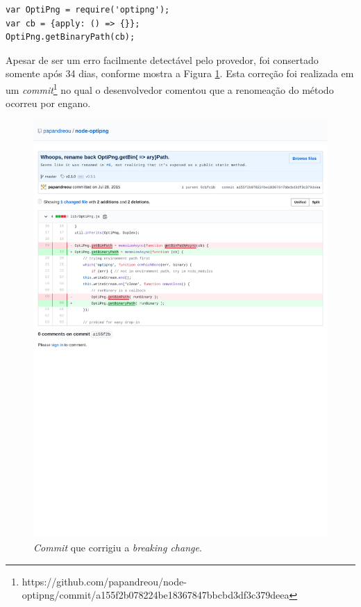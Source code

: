 \begin{lstlisting}[style=Javascript, label=cod:bc:optipng, caption={Código que sofre \textit{breaking change} do pacote \textit{optipng}.}]
var OptiPng = require('optipng');
var cb = {apply: () => {}};
OptiPng.getBinaryPath(cb);
\end{lstlisting}

Apesar de ser um erro facilmente detectável pelo provedor, foi consertado somente após 34 dias, conforme mostra a Figura \ref{fig:bc_optipng}. Esta correção foi realizada em um \textit{commit}\footnote{https://github.com/papandreou/node-optipng/commit/a155f2b078224be18367847bbcbd3df3c379deea} no qual o desenvolvedor comentou que a renomeação do método ocorreu por engano.

\begin{figure}
    \centering
    \includegraphics[scale=0.75]{figuras/bc_example.pdf}
    \caption{\textit{Commit} que corrigiu a \textit{breaking change}.}
    \label{fig:bc_optipng}
\end{figure}{}

